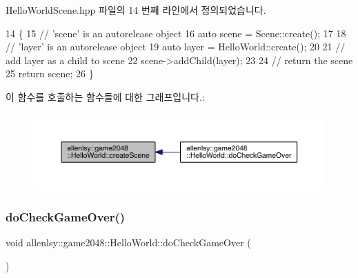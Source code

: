 Hello\+World\+Scene.\+hpp 파일의 14 번째 라인에서 정의되었습니다.


\begin{DoxyCode}
14                                       \{
15         \textcolor{comment}{// 'scene' is an autorelease object}
16         \textcolor{keyword}{auto} scene = Scene::create();
17         
18         \textcolor{comment}{// 'layer' is an autorelease object}
19         \textcolor{keyword}{auto} layer = HelloWorld::create();
20         
21         \textcolor{comment}{// add layer as a child to scene}
22         scene->addChild(layer);
23         
24         \textcolor{comment}{// return the scene}
25         \textcolor{keywordflow}{return} scene;
26     \}
\end{DoxyCode}
이 함수를 호출하는 함수들에 대한 그래프입니다.\+:
\nopagebreak
\begin{figure}[H]
\begin{center}
\leavevmode
\includegraphics[width=350pt]{d5/d2b/classallenlsy_1_1game2048_1_1_hello_world_a86ca8a563151e5e5d308f98ff6c36f95_icgraph}
\end{center}
\end{figure}
\mbox{\label{classallenlsy_1_1game2048_1_1_hello_world_a4f9c99959e2c14cd349470d305909fca}} 
\subsubsection{\texorpdfstring{do\+Check\+Game\+Over()}{doCheckGameOver()}}
{\footnotesize\ttfamily void allenlsy\+::game2048\+::\+Hello\+World\+::do\+Check\+Game\+Over (\begin{DoxyParamCaption}{ }\end{DoxyParamCaption})\hspace{0.3cm}{\ttfamily [inline]}}



